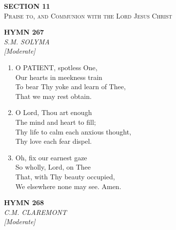 \documentclass[11pt,a4paper]{article}
\begin{document}
\newpage
\thispagestyle{empty}
\vspace*{3.5cm}
\begin{center}
    {\LARGE \textbf{SECTION 11}}\\[0.8em]
    {\Large \textsc{Praise to, and Communion with the Lord Jesus Christ}}
\end{center}
\vspace{3.5cm}

\newpage
\begin{center}
    {\Large \textbf{HYMN 267}}
    \\
    \textit{S.M. SOLYMA}
    \\
    \textit{\small [Moderate]}
\end{center}
\vspace{1em}

\begin{enumerate}
    \item O PATIENT, spotless One, \\
        Our hearts in meekness train \\
        To bear Thy yoke and learn of Thee, \\
        That we may rest obtain.

    \item O Lord, Thou art enough \\
        The mind and heart to fill; \\
        Thy life to calm each anxious thought, \\
        Thy love each fear dispel.

    \item Oh, fix our earnest gaze \\
        So wholly, Lord, on Thee \\
        That, with Thy beauty occupied, \\
        We elsewhere none may see. Amen.

\end{enumerate}

\newpage
\begin{center}
    {\Large \textbf{HYMN 268}}
    \\
    \textit{C.M. CLAREMONT}
    \\
    \textit{\small [Moderate]}
\end{center}
\vspace{1em}
\end{document}
